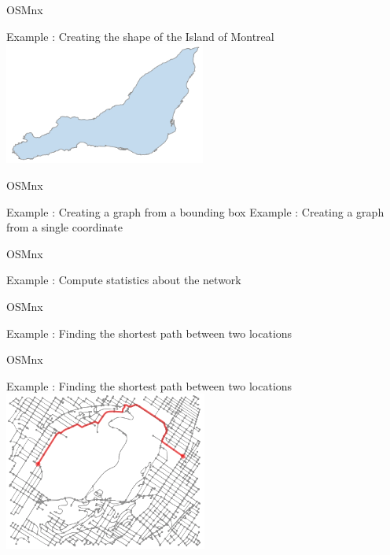\documentclass[aspectratio=169]{beamer}
\begin{document}
\begin{frame}{OSMnx \cite{boeing2017osmnx}}

{\Large Example : Creating the shape of the Island of Montreal}
{\small }
\centering
\includegraphics[height=4cm]{figures/montreal_shape}

\end{frame}

\begin{frame}{OSMnx \cite{boeing2017osmnx}}

{\Large Example : Creating a graph from a bounding box}
{\small }
\vspace{.5cm}
{\Large Example : Creating a graph from a single coordinate}
{\small }

\end{frame}

\begin{frame}{OSMnx \cite{boeing2017osmnx}}

{\Large Example : Compute statistics about the network}
{\small }
{\small }

\end{frame}

\begin{frame}{OSMnx \cite{boeing2017osmnx}}

{\Large Example : Finding the shortest path between two locations}
{\footnotesize }

\end{frame}

\begin{frame}{OSMnx \cite{boeing2017osmnx}}

{\Large Example : Finding the shortest path between two locations}
\centering
\includegraphics[width=0.5\textwidth]{figures/shortest_path}

\end{frame}
\end{document}
